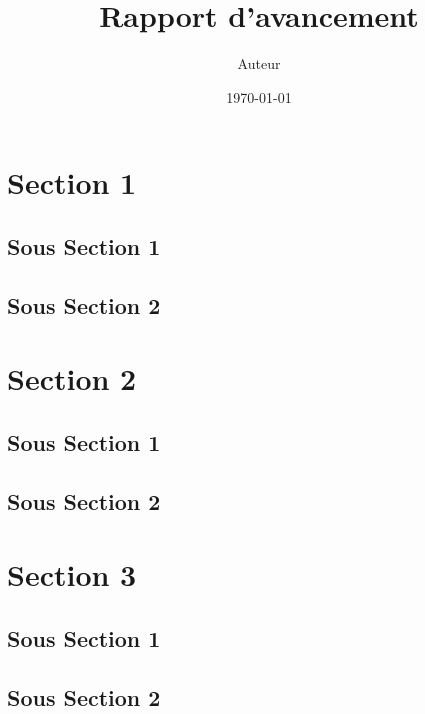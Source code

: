 \documentclass[a4paper,12pt]{report}
\author{Auteur}
\title{Rapport d'avancement}
\date{\today}
\begin{document}
\graphicspath{{Figures/}}




\renewcommand\contentsname{Sommaire}
\setcounter{chapter}{1}
\tableofcontents



\newpage

\section{Section 1}
\subsection{Sous Section 1}
\blindtext

\subsection{Sous Section 2}
\blindtext



\section{Section 2}
\subsection{Sous Section 1}
\blindtext

\subsection{Sous Section 2}
\blindtext



\section{Section 3}
\subsection{Sous Section 1}
\blindtext

\subsection{Sous Section 2}
\blindtext


\end{document}
